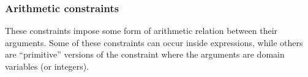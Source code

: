\subsubsection{Arithmetic constraints}

These constraints impose some form of arithmetic relation between their
arguments. Some of these constraints can occur inside expressions, while
others are ``primitive'' versions of the constraint where the arguments
are domain variables (or integers).



